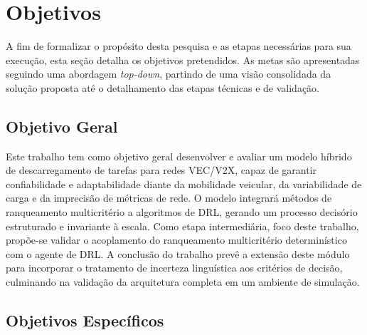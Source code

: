 \section{Objetivos}
\label{sec:objetivos}

A fim de formalizar o propósito desta pesquisa e as etapas necessárias para sua execução, esta seção detalha os objetivos pretendidos. As metas são apresentadas seguindo uma abordagem \textit{top-down}, partindo de uma visão consolidada da solução proposta até o detalhamento das etapas técnicas e de validação.

\subsection{Objetivo Geral}
\label{sec:objetivo-geral}

Este trabalho tem como objetivo geral desenvolver e avaliar um modelo híbrido de descarregamento de tarefas para redes \gls{VEC}/\gls{V2X}, capaz de garantir confiabilidade e adaptabilidade diante da mobilidade veicular, da variabilidade de carga e da imprecisão de métricas de rede. O modelo integrará métodos de ranqueamento multicritério a algoritmos de \gls{DRL}, gerando um processo decisório estruturado e invariante à escala. Como etapa intermediária, foco deste trabalho, propõe-se validar o acoplamento do ranqueamento multicritério determinístico com o agente de \gls{DRL}. A conclusão do trabalho prevê a extensão deste módulo para incorporar o tratamento de incerteza linguística aos critérios de decisão, culminando na validação da arquitetura completa em um ambiente de simulação.

\subsection{Objetivos Específicos}
\label{sec:objetivos-especificos}


